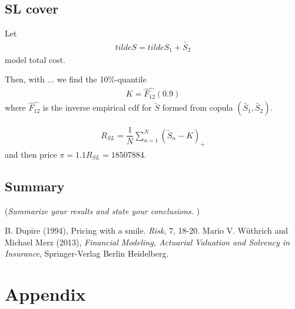 \documentclass[11pt]{article}
\begin{document}
\subsection*{SL cover}
Let
\begin{align*} 
	tilde{S}= tilde{S_1} + \tilde{S_2}
\end{align*}
model total cost.

Then, with ... we find the 10\%-quantile
\begin{align*} 
	K = \hat{F}_{12}^\leftharpoonup(0.9)
\end{align*}
where $\hat{F}_{12}^\leftharpoonup$ is the inverse empirical cdf for $\tilde{S}$  formed from copula $(\tilde{S_1}, \tilde{S_2})$.

\begin{align} \label{eqsl1}
	R_{SL} = \dfrac{1}{N}\sum_{n=1}^N\left(	 \tilde{S}_n-K\right)_+        
\end{align}
and then price $\pi = 1.1R_{SL} = 18507884$.

\subsection*{Summary}
({\it Summarize your results and state your conclusions. })



\begin{thebibliography}{99}
B. Dupire (1994),
Pricing with a smile.
\emph{Risk}, 7, 18-20.
  Mario V. W\"{u}thrich and Michael Merz (2013),
  \emph{Financial Modeling, Actuarial Valuation and Solvency in Insurance},
  Springer-Verlag Berlin Heidelberg.
\end{thebibliography}


\section*{Appendix}
\end{document}
